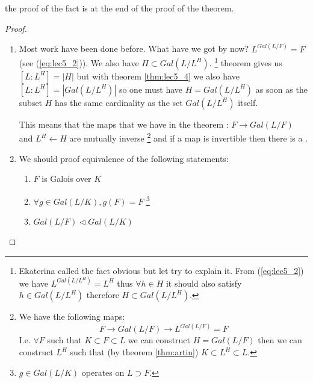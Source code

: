 \begin{theorem}
\begin{enumerate}
{      the proof of the fact is at the end of the proof of the theorem. 
    }
  \end{enumerate}
  \begin{proof}
    \begin{enumerate}
    \item Most work have been done before. What have we got by now?
      $L^{Gal\left(L/F\right)} = F$ (see (\ref{eq:lec5_2})). We also
      have $H \subset Gal\left(L/L^H\right)$.
      \footnote{
        Ekaterina called the fact obvious but let try to explain it.
        From (\ref{eq:lec5_2}) we have
        $L^{Gal\left(L/L^H\right)} = L^H$ thus
        $\forall h \in H$ it should also satisfy $h \in
        Gal\left(L/L^H\right)$ therefore $H \subset
        Gal\left(L/L^H\right)$. 
      }
       theorem gives us
      $\left[L:L^H\right] = \left|H\right|$ but with theorem
      \ref{thm:lec5_4} we also have
      $\left[L:L^H\right] = \left|Gal\left(L/L^H\right)\right|$ so one
      must have $H = Gal\left(L/L^H\right)$ as soon as the subset $H$
      has the same cardinality as the set $Gal\left(L/L^H\right)$ itself.

      This means that the maps that we have in the theorem :
      $F \rightarrow Gal\left(L/F\right)$ and
      $L^H \leftarrow H$ are mutually inverse
      \footnote{
        We have the following maps:
        \[
        F \to Gal\left(L/F\right) \to L^{Gal\left(L/F\right)} = F
        \]
        I.e. $\forall F$ such that $K \subset F \subset L$ we can
        construct $H = Gal\left(L/F\right)$ then we can construct
        $L^H$ such that (by theorem \ref{thm:artin})
        $K \subset L^H \subset L$.
      }
      and if a map is invertible then there is a .
    \item We should proof equivalence of the following statements:
      \begin{enumerate}
      \item $F$ is Galois over $K$ \label{item:galoiscorrespondence1}
      \item $\forall g \in Gal\left(L/K\right), g\left(F\right) = F$
        \label{item:galoiscorrespondence2}
        \footnote{
          $g \in Gal\left(L/K\right)$ operates on $L \supset F$.
        }
      \item $Gal\left(L/F\right) \triangleleft Gal\left(L/K\right)$
        \label{item:galoiscorrespondence3}
      \end{enumerate}      
    \end{enumerate}


\end{proof}
\end{theorem}
